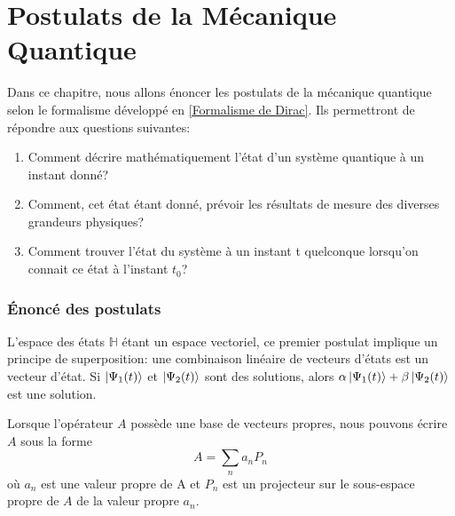 \documentclass[../notesdecours.tex]{subfiles}
\begin{document}
\newpage
\part{Postulats de la Mécanique Quantique}
Dans ce chapitre, nous allons énoncer les postulats de la mécanique quantique selon le formalisme développé en \ref{Formalisme de Dirac}. Ils permettront de répondre aux questions suivantes:
\begin{enumerate}
\item Comment décrire mathématiquement l'état d'un système quantique à un instant donné?
\item Comment, cet état étant donné, prévoir les résultats de mesure des diverses grandeurs physiques?
\item Comment trouver l'état du système à un instant t quelconque lorsqu'on connait  ce état à l'instant $t_0$?
\end{enumerate}
\section{Énoncé des postulats}

\begin{center}
\end{center}
\begin{remark}
L'espace des états $\mathbb{H}$ étant un espace vectoriel, ce premier postulat implique un principe de superposition: une combinaison linéaire de vecteurs d'états est un vecteur d'état. Si $\ket{\Psi_1 (t)}$ et $\ket{\Psi_2 (t)}$ sont des solutions, alors $\alpha\ket{\Psi_1 (t)}+\beta\ket{\Psi_2 (t)}$ est une solution. \end{remark}

\begin{center}
\end{center}
Lorsque l'opérateur $A$ possède une base de vecteurs propres, nous pouvons écrire $A$ sous la forme\begin{equation}
A = \sum_n a_nP_n
\end{equation}
où $a_n$ est une valeur propre de A et $P_n$ est un projecteur sur le sous-espace propre de $A$ de la valeur propre $a_n$.\\
\end{document}
